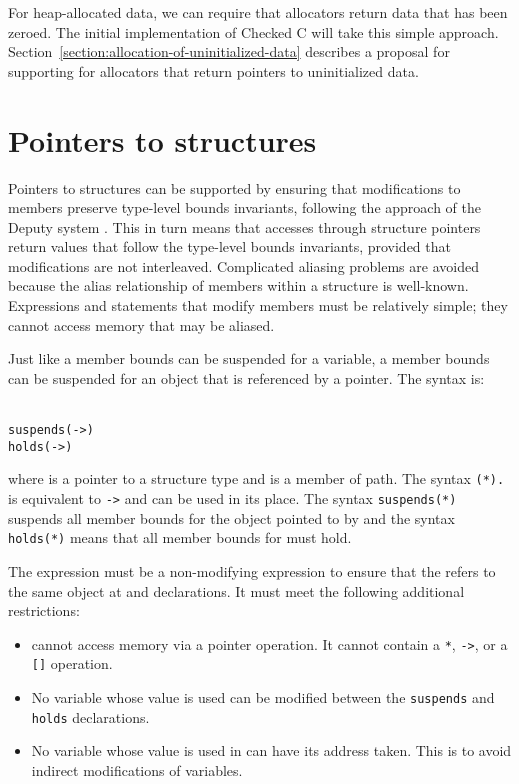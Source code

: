 For heap-allocated data, we can require that allocators
return data that has been zeroed.  The initial implementation of
Checked C will take this simple approach.  Section~\ref{section:allocation-of-uninitialized-data} 
describes a proposal for supporting for allocators that return pointers to
uninitialized data.
 
\section{Pointers to structures}

Pointers to  structures can be supported by ensuring that modifications to members
preserve type-level bounds invariants, following the approach of the Deputy
system \cite{Condit2007}.  This in turn means that accesses through structure
pointers return values that  follow the type-level bounds invariants, provided that modifications
are not interleaved.  Complicated aliasing problems are avoided because the
alias relationship of members within a structure is well-known.  Expressions
and statements that modify members must be relatively simple; they cannot access memory
that may be aliased.

Just like a member bounds can be suspended for a variable, a member bounds can 
be suspended for an object that is referenced by a pointer. The syntax is:

\begin{tabbing}
\= \\
\>\texttt{suspends(->)} \\
\>\texttt{holds(->)} \\
\end{tabbing}

where  is a pointer to a structure type  and  is a member of
path.  The syntax \texttt{(*).} is equivalent to 
\texttt{->} and can be used in its place.  
The syntax \texttt{suspends(*)} suspends all member bounds for 
the object pointed to by  and the syntax \texttt{holds(*)} 
means that all member bounds for  must hold.

The expression  must be a non-modifying expression to ensure that the 
refers to the same object at  and  declarations.
It must meet the following additional restrictions:
\begin{itemize}
\item {} cannot access memory via a pointer operation.
      It cannot contain a \texttt{*}, \texttt{->},  or a \texttt{[]} operation.
\item No variable whose value is used  can be modified between the \texttt{suspends}
and \texttt{holds} declarations.
\item No variable whose value is used in  can have its address taken. 
This is to avoid indirect modifications of variables.
\end{itemize}

